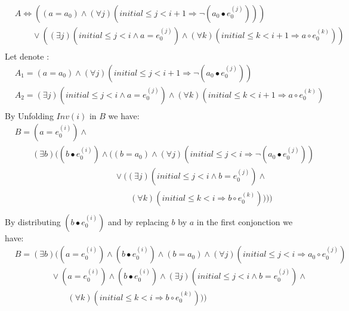 \documentclass[a4paper,10pt]{article}
\newcommand{\idx}{\ensuremath{i}\xspace}
\newcommand{\idxinitial}{\ensuremath{\mathit{initial}}\xspace}
\newcommand{\at}[1]{{(#1)}}
\newcommand{\impl}{\ensuremath{\Longrightarrow}}
\newcommand{\Inv}[1]{\ensuremath{\mathit{Inv}(#1)\xspace}}
\newenvironment{proof}[1][Proof.]{\begin{trivlist}
\item[\hskip \labelsep {\bfseries #1}]}{\end{trivlist}}
\begin{document}
\begin{proof}
  \begin{align*}
    &A\Leftrightarrow ((a = a_0) \land (\forall j)(\idxinitial \leq j < \idx+1 \impl \neg (a_0 \bullet e_0^\at{j}))) \\
    &\phantom{A=} 
       \lor ((\exists j)(\idxinitial \leq j < \idx \land a = e_0^\at{j}) \land 
       (\forall k)(\idxinitial \leq k < \idx+1 \impl a \circ e_0^\at{k})) \\           
  \end{align*}
  Let denote :
  \begin{align*}
    &A_1=(a = a_0) \land (\forall j)(\idxinitial \leq j < \idx+1 \impl \neg (a_0 \bullet e_0^\at{j}))\\
    &A_2=(\exists j)(\idxinitial \leq j < \idx \land a = e_0^\at{j}) \land 
          (\forall k)(\idxinitial \leq k < \idx+1 \impl a \circ e_0^\at{k})\\
  \end{align*}
  By Unfolding $\Inv{\idx}$ in $B$ we have:
  \begin{align*}
    &B= (a = e_0^\at{\idx}) \land \\
    &\phantom{B=} 
       (\exists b) ((b \bullet e_0^\at{\idx}) \land ((b = a_0) \land 
       (\forall j)(\idxinitial \leq j < \idx \impl \neg (a_0 \bullet e_0^\at{j})) \\
    &\phantom{B= (a = e_0^\at{\idx}) \land (\exists b) (} 
       \lor ((\exists j)(\idxinitial \leq j < \idx \land b = e_0^\at{j}) \land \\
    &\phantom{B= (a = e_0^\at{\idx}) \land ((b \bullet e_0\at{\idx}} 
       (\forall k)(\idxinitial \leq k < \idx \impl b \circ e_0^\at{k})))) \\
  \end{align*}
  By distributing $(b \bullet e_0^\at{\idx})$ and by replacing $b$ by $a$ in the first conjonction we have:
  \begin{align*}
    &B=(\exists b) ((a = e_0^\at{\idx}) \land (b \bullet e_0^\at{\idx}) \land 
       (b = a_0) \land (\forall j)(\idxinitial \leq j < \idx \impl a_0 \circ e_0^\at{j}) \\
    &\phantom{B= (a =} 
       \lor (a = e_0^\at{\idx}) \land  (b \bullet e_0^\at{\idx}) \land 
       (\exists j)(\idxinitial \leq j < \idx \land b = e_0^\at{j}) \land \\
    &\phantom{B= (a = e_0^\at{\idx}} 
       (\forall k)(\idxinitial \leq k < \idx \impl b \circ e_0^\at{k}))) \\
  \end{align*}

\end{proof}
\end{document}
